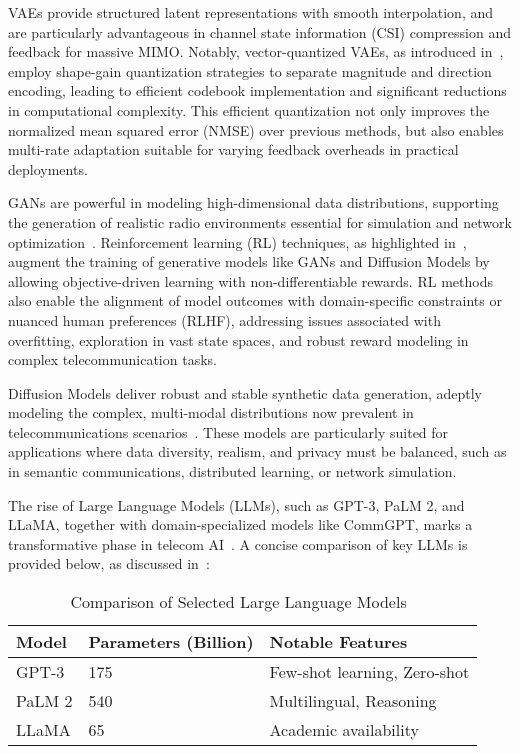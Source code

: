 \documentclass[sigconf]{acmart}
\begin{document}
VAEs provide structured latent representations with smooth interpolation, and are particularly advantageous in channel state information (CSI) compression and feedback for massive MIMO. Notably, vector-quantized VAEs, as introduced in~\cite{ref13}, employ shape-gain quantization strategies to separate magnitude and direction encoding, leading to efficient codebook implementation and significant reductions in computational complexity. This efficient quantization not only improves the normalized mean squared error (NMSE) over previous methods, but also enables multi-rate adaptation suitable for varying feedback overheads in practical deployments.

GANs are powerful in modeling high-dimensional data distributions, supporting the generation of realistic radio environments essential for simulation and network optimization~\cite{ref1,ref7}. Reinforcement learning (RL) techniques, as highlighted in~\cite{ref1}, augment the training of generative models like GANs and Diffusion Models by allowing objective-driven learning with non-differentiable rewards. RL methods also enable the alignment of model outcomes with domain-specific constraints or nuanced human preferences (RLHF), addressing issues associated with overfitting, exploration in vast state spaces, and robust reward modeling in complex telecommunication tasks.

Diffusion Models deliver robust and stable synthetic data generation, adeptly modeling the complex, multi-modal distributions now prevalent in telecommunications scenarios~\cite{ref44}. These models are particularly suited for applications where data diversity, realism, and privacy must be balanced, such as in semantic communications, distributed learning, or network simulation.

The rise of Large Language Models (LLMs), such as GPT-3, PaLM 2, and LLaMA, together with domain-specialized models like CommGPT, marks a transformative phase in telecom AI~\cite{ref26,ref33,ref21,ref7}. A concise comparison of key LLMs is provided below, as discussed in~\cite{ref7}:

\begin{table*}[htbp]
\centering
\caption{Comparison of Selected Large Language Models~\cite{ref7}}
\label{tab:llm-comparison}
\begin{adjustbox}{max width=\textwidth}
\begin{tabular}{@{}lll@{}}
\toprule
\textbf{Model} & \textbf{Parameters (Billion)} & \textbf{Notable Features} \\
\midrule
GPT-3 & 175 & Few-shot learning, Zero-shot \\
PaLM 2 & 540 & Multilingual, Reasoning \\
LLaMA & 65 & Academic availability \\
\bottomrule
\end{tabular}
\end{adjustbox}
\end{table*}
\end{document}
